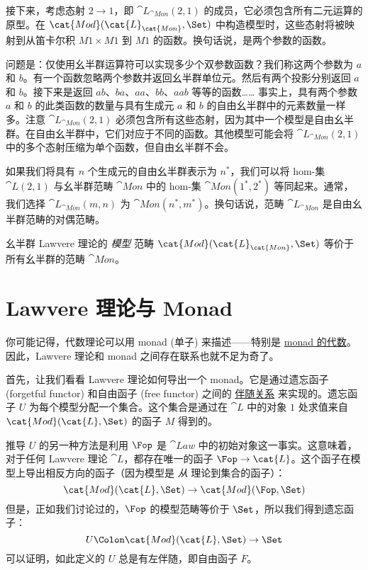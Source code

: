 接下来，考虑态射 $2 \to 1$，即 $\cat{L}_{\cat{Mon}}(2, 1)$ 的成员，它必须包含所有二元运算的原型。在 $\cat{Mod}(\cat{L}_{\cat{Mon}}, \Set)$ 中构造模型时，这些态射将被映射到从笛卡尔积 $M 1 \times M 1$ 到 $M 1$ 的函数。换句话说，是两个参数的函数。

问题是：仅使用幺半群运算符可以实现多少个双参数函数？我们称这两个参数为 $a$ 和 $b$。有一个函数忽略两个参数并返回幺半群单位元。然后有两个投影分别返回 $a$ 和 $b$。接下来是返回 $ab$、$ba$、$aa$、$bb$、$aab$ 等等的函数…… 事实上，具有两个参数 $a$ 和 $b$ 的此类函数的数量与具有生成元 $a$ 和 $b$ 的自由幺半群中的元素数量一样多。注意 $\cat{L}_{\cat{Mon}}(2, 1)$ 必须包含所有这些态射，因为其中一个模型是自由幺半群。在自由幺半群中，它们对应于不同的函数。其他模型可能会将 $\cat{L}_{\cat{Mon}}(2, 1)$ 中的多个态射压缩为单个函数，但自由幺半群不会。

如果我们将具有 $n$ 个生成元的自由幺半群表示为 $n^*$，我们可以将 hom-集 $\cat{L}(2, 1)$ 与幺半群范畴 $\cat{Mon}$ 中的 hom-集 $\cat{Mon}(1^*, 2^*)$ 等同起来。通常，我们选择 $\cat{L}_{\cat{Mon}}(m, n)$ 为 $\cat{Mon}(n^*, m^*)$。换句话说，范畴 $\cat{L}_{\cat{Mon}}$ 是自由幺半群范畴的对偶范畴。

幺半群 Lawvere 理论的 \emph{模型} 范畴 $\cat{Mod}(\cat{L}_{\cat{Mon}}, \Set)$ 等价于所有幺半群的范畴 $\cat{Mon}$。

\section{Lawvere 理论与 Monad}

你可能记得，代数理论可以用 monad (单子) 来描述——特别是 \hyperref[algebras-for-monads]{monad 的代数}。因此，Lawvere 理论和 monad 之间存在联系也就不足为奇了。

首先，让我们看看 Lawvere 理论如何导出一个 monad。它是通过遗忘函子 (forgetful functor) 和自由函子 (free functor) 之间的 \hyperref[free-forgetful-adjunctions]{伴随关系} 来实现的。遗忘函子 $U$ 为每个模型分配一个集合。这个集合是通过在 $\cat{L}$ 中的对象 $1$ 处求值来自 $\cat{Mod}(\cat{L}, \Set)$ 的函子 $M$ 得到的。

推导 $U$ 的另一种方法是利用 $\Fop$ 是 $\cat{Law}$ 中的初始对象这一事实。这意味着，对于任何 Lawvere 理论 $\cat{L}$，都存在唯一的函子 $\Fop \to \cat{L}$。这个函子在模型上导出相反方向的函子（因为模型是 \emph{从} 理论到集合的函子）：
\[\cat{Mod}(\cat{L}, \Set) \to \cat{Mod}(\Fop, \Set)\]
但是，正如我们讨论过的，$\Fop$ 的模型范畴等价于 $\Set$，所以我们得到遗忘函子：
\[U \Colon \cat{Mod}(\cat{L}, \Set) \to \Set\]
可以证明，如此定义的 $U$ 总是有左伴随，即自由函子 $F$。

